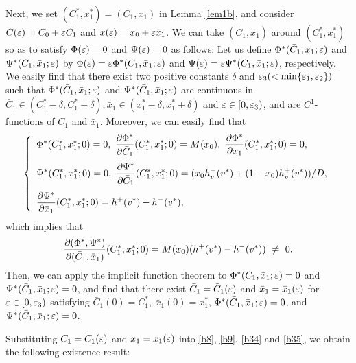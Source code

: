 \documentclass[a4,10pt]{article}
\begin{document}
Next, we set $(C_1^*, x_1^*) = (C_1, x_1)$ in Lemma \ref{lem1b}, and 
consider $C(\varepsilon) = C_0 + \varepsilon \bar{C}_1$ and 
$x(\varepsilon) = x_0 + \varepsilon \bar{x}_1$. 
We can take $(\bar{C}_1, \bar{x}_1)$ around $(C_1^*, x_1^*)$ 
so as to satisfy $\Phi(\varepsilon) = 0$ and $\Psi(\varepsilon) = 0$ as follows:
Let us define $\Phi^*(\bar{C}_1, \bar{x}_1;\varepsilon)$ and  
$\Psi^*(\bar{C}_1, \bar{x}_1;\varepsilon)$ by $\Phi(\varepsilon) = \varepsilon \Phi^*(\bar{C}_1, \bar{x}_1;\varepsilon)$ and $\Psi(\varepsilon) = \varepsilon \Psi^*(\bar{C}_1, \bar{x}_1;\varepsilon)$, respectively. We easily find that there exist two positive constants $\delta$ and $\varepsilon_3 (< \min \{\varepsilon_1, \varepsilon_2\})$ 
such that $\Phi^*(\bar{C}_1, \bar{x}_1;\varepsilon)$ and $\Psi^*(\bar{C}_1, \bar{x}_1;\varepsilon)$ are continuous in $\bar{C}_1 \in (C_1^*-\delta, C_1^*+\delta), \bar{x}_1 \in (x_1^*-\delta, x_1^*+\delta)$ and $\varepsilon \in [0,\varepsilon_3)$, and are $C^1$-functions of $\bar{C}_1$ and $\bar{x}_1$. Moreover, we can easily find that 
%
\[ \left\{ 
\begin{array}{l}
\Phi^*(C_1^*, x_1^*;0) = 0, \
\dis\frac {\partial \Phi^*}{\partial \bar{C}_1}(C_1^*, x_1^*;0) = M(x_0), \
\dis\frac {\partial \Phi^*}{\partial \bar{x}_1}(C_1^*, x_1^*;0) = 0, 
\\[3ex]
\dis\Psi^*(C_1^*, x_1^*;0) = 0, \ 
\dis\frac {\partial \Psi^*}{\partial \bar{C}_1}(C_1^*, x_1^*;0) 
= ( x_0 h_v^-(v^*) +  (1 - x_0) h_v^+(v^*))/D,  
\\[3ex]
%
\dis\frac {\partial \Psi^*}{\partial \bar{x}_1}(C_1^*, x_1^*;0) = h^+(v^*) - h^-(v^*), 
\end{array} \right.
\]
%
which implies that 
%
\[
\begin{array}{l}
\displaystyle\frac {\partial (\Phi^*, \Psi^*)}{\partial (\bar{C}_1, \bar{x}_1)}(C_1^*, x_1^*;0) 
 = M(x_0) (h^+(v^*) - h^-(v^*)) \  \ne \ 0. 
\end{array}
\]
%
Then, we can apply the implicit function theorem to $\Phi^*(\bar{C}_1, \bar{x}_1;\varepsilon) = 0$ and  
$\Psi^*(\bar{C}_1, \bar{x}_1;\varepsilon) = 0$, and find that there exist $\bar{C}_1 = \bar{C}_1(\varepsilon)$
and $\bar{x}_1 = 
\bar{x}_1(\varepsilon)$ for $\varepsilon \in [0,\varepsilon_3)$ satisfying $\bar{C}_1(0) = C_1^*, \ \bar{x}_1(0) = 
 x_1^*$,  
$\Phi^*(\bar{C}_1, \bar{x}_1;\varepsilon) = 0$, and $\Psi^*(\bar{C}_1, \bar{x}_1;\varepsilon) = 0$.

Substituting $C_1 = \bar{C}_1(\varepsilon)$ and $x_1 = \bar{x}_1(\varepsilon)$ into 
\eqref{b8}, \eqref{b9}, \eqref{b34} and \eqref{b35}, we obtain the following existence result: 
\end{document}
